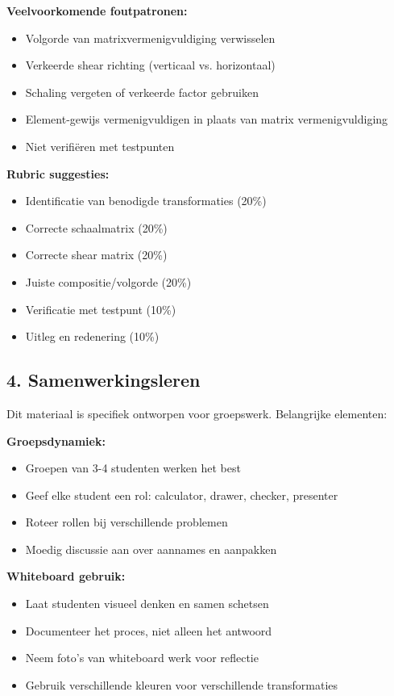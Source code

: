 \documentclass{ximera}
\begin{document}
\textbf{Veelvoorkomende foutpatronen:}
\begin{itemize}
\item Volgorde van matrixvermenigvuldiging verwisselen
\item Verkeerde shear richting (verticaal vs. horizontaal)
\item Schaling vergeten of verkeerde factor gebruiken
\item Element-gewijs vermenigvuldigen in plaats van matrix vermenigvuldiging
\item Niet verifiëren met testpunten
\end{itemize}

\textbf{Rubric suggesties:}
\begin{itemize}
\item Identificatie van benodigde transformaties (20\%)
\item Correcte schaalmatrix (20\%)
\item Correcte shear matrix (20\%)
\item Juiste compositie/volgorde (20\%)
\item Verificatie met testpunt (10\%)
\item Uitleg en redenering (10\%)
\end{itemize}

\subsection*{4. Samenwerkingsleren}

Dit materiaal is specifiek ontworpen voor groepswerk. Belangrijke elementen:

\textbf{Groepsdynamiek:}
\begin{itemize}
\item Groepen van 3-4 studenten werken het best
\item Geef elke student een rol: calculator, drawer, checker, presenter
\item Roteer rollen bij verschillende problemen
\item Moedig discussie aan over aannames en aanpakken
\end{itemize}

\textbf{Whiteboard gebruik:}
\begin{itemize}
\item Laat studenten visueel denken en samen schetsen
\item Documenteer het proces, niet alleen het antwoord
\item Neem foto's van whiteboard werk voor reflectie
\item Gebruik verschillende kleuren voor verschillende transformaties
\end{itemize}
\end{document}
